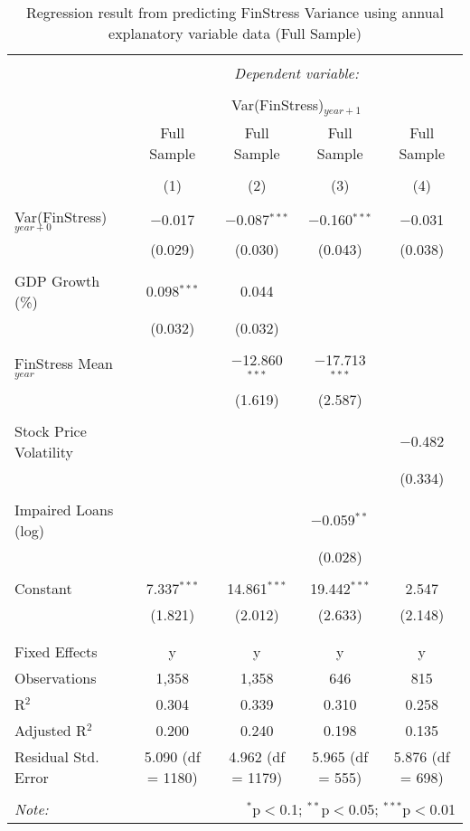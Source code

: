 
\begin{table}[!htbp] \centering 
  \caption{Regression result from predicting FinStress Variance using annual explanatory variable data (Full Sample)} 
  \label{annual_reg} 
\tiny 
\begin{tabular}{@{\extracolsep{5pt}}lcccc} 
\\[-1.8ex]\hline 
\hline \\[-1.8ex] 
 & \multicolumn{4}{c}{\textit{Dependent variable:}} \\ 
\cline{2-5} 
\\[-1.8ex] & \multicolumn{4}{c}{Var(FinStress)$_{year+1}$} \\ 
 & Full Sample & Full Sample & Full Sample & Full Sample \\ 
\\[-1.8ex] & (1) & (2) & (3) & (4)\\ 
\hline \\[-1.8ex] 
 Var(FinStress)$_{year+0}$ & $-$0.017 & $-$0.087$^{***}$ & $-$0.160$^{***}$ & $-$0.031 \\ 
  & (0.029) & (0.030) & (0.043) & (0.038) \\ 
  & & & & \\ 
 GDP Growth (\%) & 0.098$^{***}$ & 0.044 &  &  \\ 
  & (0.032) & (0.032) &  &  \\ 
  & & & & \\ 
 FinStress Mean$_{year}$ &  & $-$12.860$^{***}$ & $-$17.713$^{***}$ &  \\ 
  &  & (1.619) & (2.587) &  \\ 
  & & & & \\ 
 Stock Price Volatility &  &  &  & $-$0.482 \\ 
  &  &  &  & (0.334) \\ 
  & & & & \\ 
 Impaired Loans (log) &  &  & $-$0.059$^{**}$ &  \\ 
  &  &  & (0.028) &  \\ 
  & & & & \\ 
 Constant & 7.337$^{***}$ & 14.861$^{***}$ & 19.442$^{***}$ & 2.547 \\ 
  & (1.821) & (2.012) & (2.633) & (2.148) \\ 
  & & & & \\ 
\hline \\[-1.8ex] 
Fixed Effects & y & y & y & y \\ 
Observations & 1,358 & 1,358 & 646 & 815 \\ 
R$^{2}$ & 0.304 & 0.339 & 0.310 & 0.258 \\ 
Adjusted R$^{2}$ & 0.200 & 0.240 & 0.198 & 0.135 \\ 
Residual Std. Error & 5.090 (df = 1180) & 4.962 (df = 1179) & 5.965 (df = 555) & 5.876 (df = 698) \\ 
\hline 
\hline \\[-1.8ex] 
\textit{Note:}  & \multicolumn{4}{r}{$^{*}$p$<$0.1; $^{**}$p$<$0.05; $^{***}$p$<$0.01} \\ 
\end{tabular} 
\end{table} 
